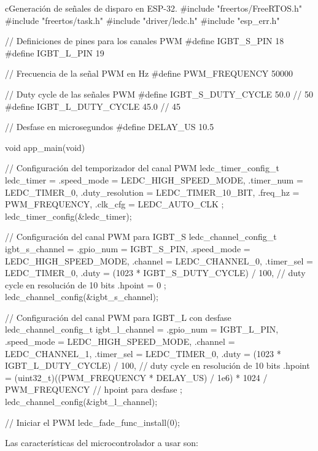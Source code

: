 \begin{sourcecode}{c}{Generación de señales de disparo en ESP-32.}
#include "freertos/FreeRTOS.h"
#include "freertos/task.h"
#include "driver/ledc.h"
#include "esp_err.h"

// Definiciones de pines para los canales PWM
#define IGBT_S_PIN    18
#define IGBT_L_PIN    19

// Frecuencia de la señal PWM en Hz
#define PWM_FREQUENCY 50000

// Duty cycle de las señales PWM
#define IGBT_S_DUTY_CYCLE  50.0 // 50%
#define IGBT_L_DUTY_CYCLE  45.0 // 45%

// Desfase en microsegundos
#define DELAY_US 10.5

void app_main(void) {
	// Configuración del temporizador del canal PWM
	ledc_timer_config_t ledc_timer = {
		.speed_mode       = LEDC_HIGH_SPEED_MODE,
		.timer_num        = LEDC_TIMER_0,
		.duty_resolution  = LEDC_TIMER_10_BIT,
		.freq_hz          = PWM_FREQUENCY,
		.clk_cfg          = LEDC_AUTO_CLK
	};
	ledc_timer_config(&ledc_timer);
	
	// Configuración del canal PWM para IGBT_S
	ledc_channel_config_t igbt_s_channel = {
		.gpio_num       = IGBT_S_PIN,
		.speed_mode     = LEDC_HIGH_SPEED_MODE,
		.channel        = LEDC_CHANNEL_0,
		.timer_sel      = LEDC_TIMER_0,
		.duty           = (1023 * IGBT_S_DUTY_CYCLE) / 100, // duty cycle en resolución de 10 bits
		.hpoint         = 0
	};
	ledc_channel_config(&igbt_s_channel);
	
	// Configuración del canal PWM para IGBT_L con desfase
	ledc_channel_config_t igbt_l_channel = {
		.gpio_num       = IGBT_L_PIN,
		.speed_mode     = LEDC_HIGH_SPEED_MODE,
		.channel        = LEDC_CHANNEL_1,
		.timer_sel      = LEDC_TIMER_0,
		.duty           = (1023 * IGBT_L_DUTY_CYCLE) / 100, // duty cycle en resolución de 10 bits
		.hpoint         = (uint32_t)((PWM_FREQUENCY * DELAY_US) / 1e6) * 1024 / PWM_FREQUENCY // hpoint para desfase
	};
	ledc_channel_config(&igbt_l_channel);
	
	// Iniciar el PWM
	ledc_fade_func_install(0);
}

\end{sourcecode}

Las características del microcontrolador a usar son:


